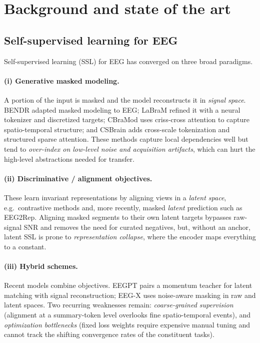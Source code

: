 \documentclass[11pt]{article}
\begin{document}
\section{Background and state of the art}
\label{sec:related}

\subsection{Self-supervised learning for EEG}
Self-supervised learning (SSL) for EEG has converged on three broad paradigms.

\paragraph{(i) Generative masked modeling.} A portion of the input is masked and
the model reconstructs it in \emph{signal space}. BENDR
adapted masked modeling to EEG; LaBraM refined it with a
neural tokenizer and discretized targets; CBraMod uses
criss-cross attention to capture spatio-temporal structure; and
CSBrain adds cross-scale tokenization and structured sparse
attention. These methods capture local dependencies well but tend to
\emph{over-index on low-level noise and acquisition artifacts}, which can hurt the
high-level abstractions needed for transfer.

\paragraph{(ii) Discriminative / alignment objectives.} These learn invariant
representations by aligning views in a \emph{latent space}, e.g.\ contrastive
methods and, more recently, masked
\emph{latent} prediction such as EEG2Rep. Aligning
masked segments to their own latent targets bypasses raw-signal SNR and removes
the need for curated negatives, but, without an anchor, latent SSL is prone to
\emph{representation collapse}, where the encoder maps everything to a constant.

\paragraph{(iii) Hybrid schemes.} Recent models combine objectives. EEGPT
pairs a momentum teacher for latent matching with signal reconstruction;
EEG-X uses noise-aware masking in raw and latent spaces.
Two recurring weaknesses remain: \emph{coarse-grained supervision} (alignment at a
summary-token level overlooks fine spatio-temporal events), and \emph{optimization
bottlenecks} (fixed loss weights require expensive manual tuning and cannot track
the shifting convergence rates of the constituent tasks).
\end{document}
